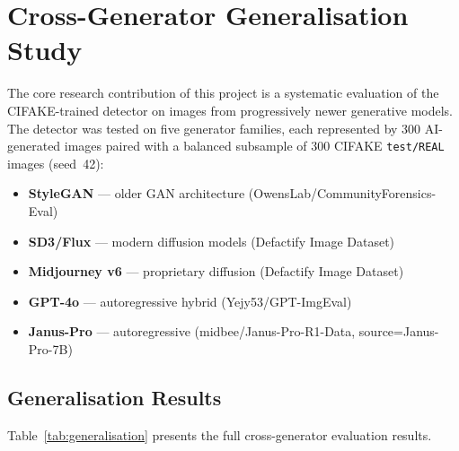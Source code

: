 \documentclass[12pt,a4paper]{article}
\begin{document}
\section{Cross-Generator Generalisation Study}
\label{sec:generalisation}

The core research contribution of this project is a systematic evaluation of the CIFAKE-trained detector on images from progressively newer generative models. The detector was tested on five generator families, each represented by 300 AI-generated images paired with a balanced subsample of 300 CIFAKE \texttt{test/REAL} images (seed~42):

\begin{itemize}[noitemsep]
    \item \textbf{StyleGAN} --- older GAN architecture (OwensLab/CommunityForensics-Eval)
    \item \textbf{SD3/Flux} --- modern diffusion models (Defactify Image Dataset)
    \item \textbf{Midjourney v6} --- proprietary diffusion (Defactify Image Dataset)
    \item \textbf{GPT-4o} --- autoregressive hybrid (Yejy53/GPT-ImgEval)
    \item \textbf{Janus-Pro} --- autoregressive (midbee/Janus-Pro-R1-Data, source=Janus-Pro-7B)
\end{itemize}

\subsection{Generalisation Results}

Table~\ref{tab:generalisation} presents the full cross-generator evaluation results.
\end{document}
